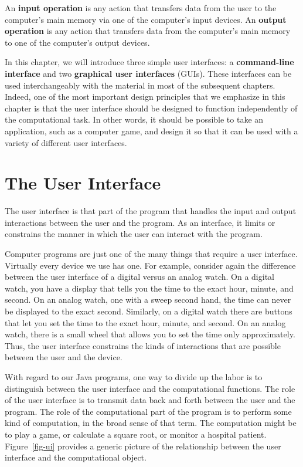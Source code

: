 An {\bf input operation} is any action that transfers data from the
user to the computer's main memory via one of the computer's input
devices. An {\bf output operation} is any action that transfers data
from the computer's main memory to one of the computer's output
devices. 

In this chapter, we will introduce three simple user interfaces: a {\bf
command-line interface} and two {\bf graphical user interfaces}
(GUIs).  These interfaces can be used interchangeably with the
material in most of the subsequent chapters. Indeed, one of the most
important design principles that we emphasize in this chapter is that
the user interface should be designed to function independently of the
computational task. In other words, it should be possible to take an
application, such as a computer game, and design it so that it can be
used with a variety of different user interfaces.  

\section{The User Interface}
\label{the-user-interface}

The user interface is that part of the program that handles the
input and output interactions between the user and the program.  As an
interface, it limits or constrains the manner in which the user can
interact with the program.

Computer programs are just one of the many things that require a user
interface.  Virtually every device we use has one. For example,
consider again the difference between the user interface of a digital
versus an analog watch. On a digital watch, you have a display that
tells you the time to the exact hour, minute, and second. On an analog
watch, one with a sweep second hand, the time can never be displayed
to the exact second. Similarly, on a digital watch there are buttons
that let you set the time to the exact hour, minute, and second. On an
analog watch, there is a small wheel that allows you to set the time
only approximately.  Thus, the user interface constrains the kinds of
interactions that are possible between the user and the device.

With regard to our Java programs, one way to divide up the labor is to
distinguish between the user interface and the computational
functions. The role of the user interface is to transmit data back and
forth between the user and the program.  The role of the computational
part of the program is to perform some kind of computation, in the
broad sense of that term. The computation might be to play a game, or
calculate a square root, or monitor a hospital patient.
Figure~\ref{fig-ui} provides a generic picture of the relationship
between the user interface and the computational object.

